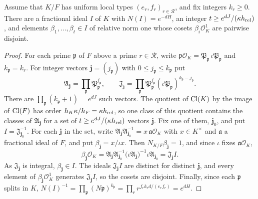 \begin{lemma}\label{geo:selection}
Assume that $K/F$ has uniform local types $(e_r,f_r)_{r\in\mathcal R}$, and
fix integers $k_r\ge0$. There are a
fractional ideal $I$ of $K$ with $N(I)=e^{-dH}$, an integer
$t\ge e^{dJ}/(\kappa h_{\rm rel})$, and elements
$\beta_1,\dots,\beta_t\in I$ of relative norm one whose cosets
$\beta_i\mathcal O_K^1$ are pairwise disjoint.
\end{lemma}

\begin{proof}
For each prime $\mathfrak p$ of $F$ above a prime $r\in\mathcal R$, write
$\mathfrak p\mathcal O_K=\mathfrak P_{\mathfrak p}\,\iota\mathfrak
P_{\mathfrak p}$ and $k_{\mathfrak p}=k_r$. For integer vectors
$\boldsymbol j=(j_{\mathfrak p})$ with $0\le j_{\mathfrak p}\le
k_{\mathfrak p}$ put
\[
 \mathfrak A_{\boldsymbol j}=\prod_{\mathfrak p}
 \mathfrak P_{\mathfrak p}^{j_{\mathfrak p}},\qquad
 \mathfrak J_{\boldsymbol j}=\prod_{\mathfrak p}
 \mathfrak P_{\mathfrak p}^{j_{\mathfrak p}}
 (\iota\mathfrak P_{\mathfrak p})^{k_{\mathfrak p}-j_{\mathfrak p}}.
\]
There are $\prod_{\mathfrak p}(k_{\mathfrak p}+1)=e^{dJ}$ such vectors.
The quotient of $\operatorname{Cl}(K)$ by the image of $\operatorname{Cl}(F)$ has order
$h_K\kappa/h_F=\kappa h_{\rm rel}$, so one class of this quotient
contains the classes of $\mathfrak A_{\boldsymbol j}$ for a set of
$t\ge e^{dJ}/(\kappa h_{\rm rel})$ vectors $\boldsymbol j$. Fix one of
them, $\boldsymbol j_0$, and put $I=\mathfrak J_{\boldsymbol j_0}^{-1}$.
For each $\boldsymbol j$ in the set, write
$\mathfrak A_{\boldsymbol j}\mathfrak A_{\boldsymbol j_0}^{-1}
=x\,\mathfrak a\mathcal O_K$ with $x\in K^\times$ and $\mathfrak a$ a
fractional ideal of $F$, and put $\beta_{\boldsymbol j}=x/\iota x$.
Then $N_{K/F}\beta_{\boldsymbol j}=1$, and since $\iota$ fixes
$\mathfrak a\mathcal O_K$,
\[
 \beta_{\boldsymbol j}\mathcal O_K
 =\mathfrak A_{\boldsymbol j}\mathfrak A_{\boldsymbol j_0}^{-1}
 \bigl(\iota\mathfrak A_{\boldsymbol j}\bigr)^{-1}
 \iota\mathfrak A_{\boldsymbol j_0}
 =\mathfrak J_{\boldsymbol j}I.
\]
As $\mathfrak J_{\boldsymbol j}$ is integral,
$\beta_{\boldsymbol j}\in I$. The ideals $\mathfrak J_{\boldsymbol j}I$
are distinct for distinct $\boldsymbol j$, and every element of
$\beta_{\boldsymbol j}\mathcal O_K^1$ generates
$\mathfrak J_{\boldsymbol j}I$, so the cosets are disjoint. Finally,
since each $\mathfrak p$ splits in $K$,
$N(I)^{-1}=\prod_{\mathfrak p}(N\mathfrak p)^{k_{\mathfrak p}}
=\prod_r r^{f_rk_rd/(e_rf_r)}=e^{dH}$.
\end{proof}


